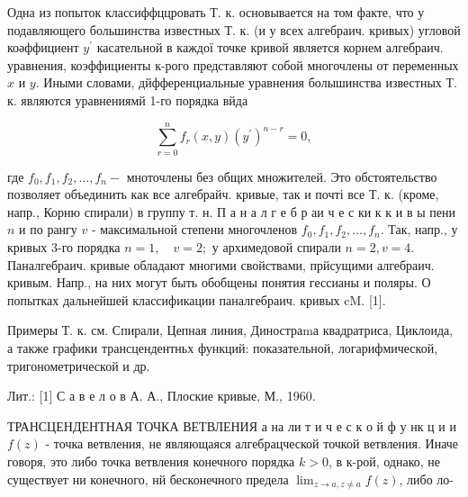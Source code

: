 \documentclass[10pt]{article}
\begin{document}
Одна из попыток классиффццровать Т. к. основывается на том факте, что у подавляющего большинства известных Т. к. (и у всех алгебраич. кривых) угловой коәффициент $y^{\prime}$ касательной в каждої точке кривой является корнем алгебраич. уравнения, коэффициенты к-рого представляют собой многочлены от переменных $x$ и $y$. Иными словами, дйфференциальные уравнения болышинства известных Т. к. являются уравнениямй 1-го порядка вйда



\[

\sum_{r=0}^{n} f_{r}(x, y)\left(y^{\prime}\right)^{n-r}=0,

\]



где $f_{0}, f_{1}, f_{2}, \ldots, f_{n}-$ мноточлены без общих множителей. Это обстоятельство позволяет объединить как все алгебрайч. кривые, так и почті все Т. к. (кроме, напр., Корню спирали) в группу т. н. П а н а л г е б р аи ч е с ки к к и в ы пени $n$ и по рангу $v$ - максимальной степени многочленов $f_{0}, f_{1}, f_{2}, \ldots, f_{n}$. Так, напр., у кривых 3-го порядка $n=1, \quad v=2 ;$ у архимедовой спирали $n=2, v=4$. Паналгебраич. кривые обладают многими свойствами, прйсущими алгебраич. кривым. Напр., на них могут быть обобщены понятия гессианы и поляры. О попытках дальнейшей классификации паналгебраич. кривых cM. [1].



Примеры Т. к. см. Спирали, Цепная линия, Диностраmа квадратриса, Циклоида, а также графики трансцендентньх функций: показательной, логарифмической, тригонометрической и др.



Лит.: [1] С а в е л о в А. А., Плоские кривые, М., 1960.



ТРАНСЦЕНДЕНТНАЯ ТОЧКА ВЕТВЛЕНИЯ а на ли т и ч е с к о й ф у нк ц и и $f(z)$ - точка ветвления, не являющаяся алгебрацческой точкой ветвления. Иначе говоря, это либо точка ветвления конечного порядка $k>0$, в к-рой, однако, не существует ни конечного, нй бесконечного предела $\lim _{z \rightarrow a, z \neq a} f(z)$, либо ло-
\end{document}
